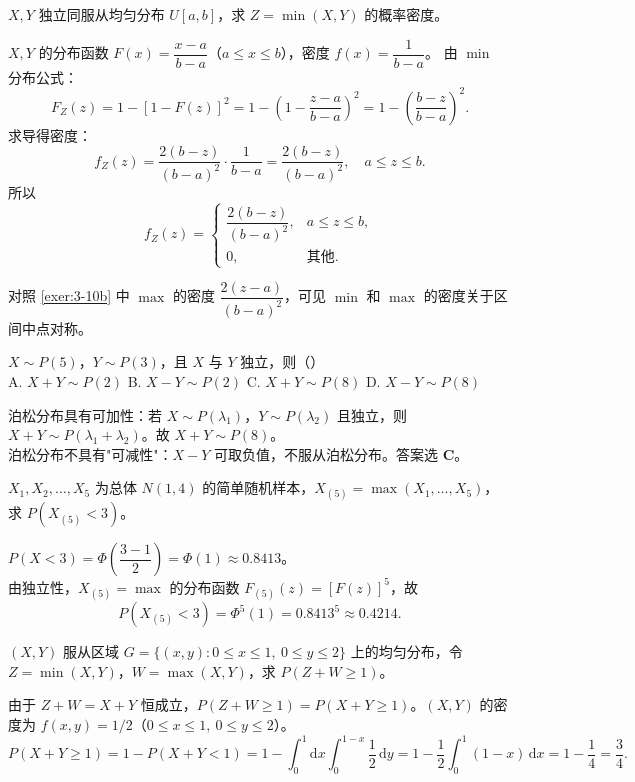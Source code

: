 \documentclass[lang=cn,11pt]{elegantbook}
\begin{document}
\begin{exercise} \label{exer:3-c16}
$X, Y$ 独立同服从均匀分布 $U[a,b]$，求 $Z = \min(X,Y)$ 的概率密度。
\end{exercise}
\begin{solution}
$X, Y$ 的分布函数 $F(x) = \dfrac{x-a}{b-a}$（$a \leqslant x \leqslant b$），密度 $f(x) = \dfrac{1}{b-a}$。
由 $\min$ 分布公式：
\[
F_Z(z) = 1 - [1-F(z)]^2 = 1 - \left(1 - \frac{z-a}{b-a}\right)^2 = 1 - \left(\frac{b-z}{b-a}\right)^2.
\]
求导得密度：
\[
f_Z(z) = \frac{2(b-z)}{(b-a)^2}\cdot\frac{1}{b-a} = \frac{2(b-z)}{(b-a)^2}, \quad a \leqslant z \leqslant b.
\]
所以
\[
f_Z(z) = \begin{cases} \dfrac{2(b-z)}{(b-a)^2}, & a \leqslant z \leqslant b, \\ 0, & \text{其他}. \end{cases}
\]
\begin{note}
对照 \ref{exer:3-10b} 中 $\max$ 的密度 $\dfrac{2(z-a)}{(b-a)^2}$，可见 $\min$ 和 $\max$ 的密度关于区间中点对称。
\end{note}
\end{solution}

\begin{exercise}[泊松可加性] \label{exer:3-c6b}
$X\sim P(5)$，$Y\sim P(3)$，且 $X$ 与 $Y$ 独立，则（\quad）\\
A. $X+Y\sim P(2)$ \quad B. $X-Y\sim P(2)$ \quad C. $X+Y\sim P(8)$ \quad D. $X-Y\sim P(8)$
\end{exercise}
\begin{solution}
泊松分布具有可加性：若 $X\sim P(\lambda_1)$，$Y\sim P(\lambda_2)$ 且独立，则 $X+Y\sim P(\lambda_1+\lambda_2)$。故 $X+Y\sim P(8)$。\\
泊松分布不具有"可减性"：$X-Y$ 可取负值，不服从泊松分布。答案选 \textbf{C}。
\end{solution}


\begin{exercise}[次序统计量的分布] \label{exer:3-c8b}
$X_1,X_2,\dots,X_5$ 为总体 $N(1,4)$ 的简单随机样本，$X_{(5)} = \max(X_1,\dots,X_5)$，求 $P(X_{(5)}<3)$。
\end{exercise}
\begin{solution}
$P(X<3) = \Phi\!\left(\dfrac{3-1}{2}\right) = \Phi(1) \approx 0.8413$。\\
由独立性，$X_{(5)} = \max$ 的分布函数 $F_{(5)}(z) = [F(z)]^5$，故
\[
P(X_{(5)}<3) = \Phi^5(1) = 0.8413^5 \approx 0.4214.
\]
\end{solution}


\begin{exercise}[min+max=X+Y] \label{exer:3-c10b}
$(X,Y)$ 服从区域 $G=\{(x,y):0\leqslant x\leqslant 1,\ 0\leqslant y\leqslant 2\}$ 上的均匀分布，令 $Z=\min(X,Y)$，$W=\max(X,Y)$，求 $P(Z+W \geqslant 1)$。
\end{exercise}
\begin{solution}
由于 $Z+W = X+Y$ 恒成立，$P(Z+W \geqslant 1) = P(X+Y \geqslant 1)$。$(X,Y)$ 的密度为 $f(x,y) = 1/2$（$0\leqslant x\leqslant 1,\ 0\leqslant y\leqslant 2$）。
\[
P(X+Y \geqslant 1) = 1 - P(X+Y < 1) = 1 - \int_0^1\mathrm{d}x\int_0^{1-x}\frac{1}{2}\,\mathrm{d}y = 1 - \frac{1}{2}\int_0^1(1-x)\,\mathrm{d}x = 1-\frac{1}{4} = \frac{3}{4}.
\]
\end{solution}
\end{document}
